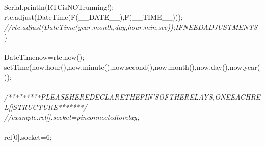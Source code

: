 \documentclass[a4paper, 12pt]{article}
\newcommand\SPC{\hspace*{0.6em}}
\newcommand\QOT{\mbox{\char 34}}
\newcommand{\CppAComment}[1]{\textit{\textcolor[rgb]{0.2,0.4,1}{#1}}}
\newcommand{\CppAIdentifier}[1]{\textcolor[rgb]{0,1,0}{#1}}
\newcommand{\CppANumber}[1]{\textcolor[rgb]{0,0,1}{#1}}
\newcommand{\CppASpace}[1]{\textcolor[rgb]{1,1,1}{\colorbox[rgb]{0,0,0}{#1}}}
\newcommand{\CppAString}[1]{\textcolor[rgb]{0.76,0.76,0.76}{#1}}
\newcommand{\CppASymbol}[1]{\textcolor[rgb]{1,0,0}{#1}}
\begin{document}
\begin{ttfamily}
\CppASpace{\SPC \SPC \SPC \SPC }\CppAIdentifier{Serial}\CppASymbol{.}\CppAIdentifier{println}\CppASymbol{(}\CppAString{\QOT RTC\SPC is\SPC NOT\SPC running!\QOT }\CppASymbol{)}\CppASymbol{;}\\
\CppASpace{\SPC \SPC \SPC \SPC }\CppAIdentifier{rtc}\CppASymbol{.}\CppAIdentifier{adjust}\CppASymbol{(}\CppAIdentifier{DateTime}\CppASymbol{(}\CppAIdentifier{F}\CppASymbol{(}\CppAIdentifier{\_\_DATE\_\_}\CppASymbol{)}\CppASymbol{,}\CppASpace{\SPC }\CppAIdentifier{F}\CppASymbol{(}\CppAIdentifier{\_\_TIME\_\_}\CppASymbol{)}\CppASymbol{)}\CppASymbol{)}\CppASymbol{;}\\
\CppASpace{\SPC \SPC \SPC }\CppAComment{//\SPC rtc.adjust(DateTime(year,\SPC month,\SPC day,\SPC hour,\SPC min,\SPC sec));\SPC IF\SPC NEED\SPC ADJUSTMENTS}\\
\CppASpace{\SPC \SPC }\CppASymbol{\}}\\
\CppASpace{\SPC \SPC }\\
\CppASpace{\SPC \SPC }\CppAIdentifier{DateTime}\CppASpace{\SPC }\CppAIdentifier{now}\CppASpace{\SPC }\CppASymbol{=}\CppASpace{\SPC }\CppAIdentifier{rtc}\CppASymbol{.}\CppAIdentifier{now}\CppASymbol{(}\CppASymbol{)}\CppASymbol{;}\\
\CppASpace{\SPC \SPC }\CppAIdentifier{setTime}\CppASymbol{(}\CppAIdentifier{now}\CppASymbol{.}\CppAIdentifier{hour}\CppASymbol{(}\CppASymbol{)}\CppASymbol{,}\CppAIdentifier{now}\CppASymbol{.}\CppAIdentifier{minute}\CppASymbol{(}\CppASymbol{)}\CppASymbol{,}\CppAIdentifier{now}\CppASymbol{.}\CppAIdentifier{second}\CppASymbol{(}\CppASymbol{)}\CppASymbol{,}\CppAIdentifier{now}\CppASymbol{.}\CppAIdentifier{month}\CppASymbol{(}\CppASymbol{)}\CppASymbol{,}\CppAIdentifier{now}\CppASymbol{.}\CppAIdentifier{day}\CppASymbol{(}\CppASymbol{)}\CppASymbol{,}\CppAIdentifier{now}\CppASymbol{.}\CppAIdentifier{year}\CppASymbol{(}\CppASymbol{)}\CppASymbol{)}\CppASymbol{;}\\
\\
\CppASpace{\SPC \SPC }\CppAComment{/*********PLEASE\SPC HERE\SPC DECLARE\SPC THE\SPC PIN'S\SPC OF\SPC THE\SPC RELAYS,\SPC ONE\SPC EACH\SPC REL[]\SPC STRUCTURE*******/}\\
\CppASpace{\SPC \SPC }\CppAComment{//example\SPC :\SPC rel[].socket\SPC =\SPC pin\SPC connected\SPC to\SPC relay\SPC ;}\\
\CppASpace{\SPC \SPC }\\
\CppASpace{\SPC \SPC }\CppAIdentifier{rel}\CppASymbol{[}\CppANumber{0}\CppASymbol{]}\CppASymbol{.}\CppAIdentifier{socket}\CppASpace{\SPC }\CppASymbol{=}\CppASpace{\SPC }\CppANumber{6}\CppASymbol{;}\\

\end{ttfamily}
\end{document}
